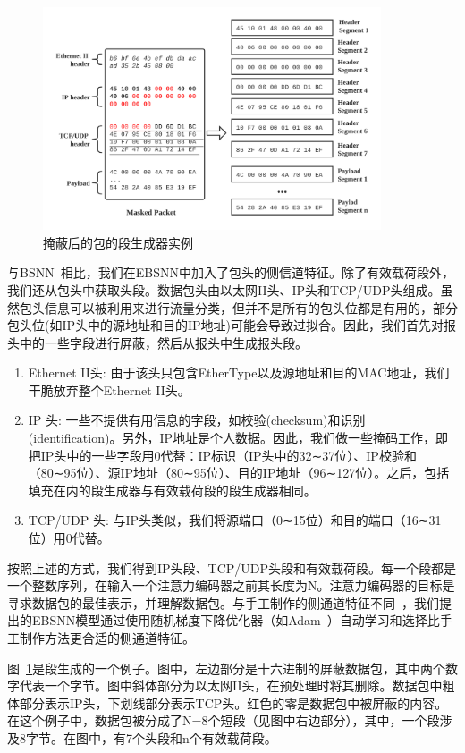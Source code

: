 \documentclass[degree=master,cjk-font=noto]{thuthesis}
\begin{document}
\begin{figure}[!tp]
	\centerline{\includegraphics[width=10cm]{BSNN_Segment.png}}
	\caption{掩蔽后的包的段生成器实例}
	\label{fig2}
\end{figure}

与BSNN~\cite{bsnn}相比，我们在EBSNN中加入了包头的侧信道特征。除了有效载荷段外，我们还从包头中获取头段。数据包头由以太网II头、IP头和TCP/UDP头组成。虽然包头信息可以被利用来进行流量分类，但并不是所有的包头位都是有用的，部分包头位(如IP头中的源地址和目的IP地址)可能会导致过拟合。因此，我们首先对报头中的一些字段进行屏蔽，然后从报头中生成报头段。

\begin{enumerate}
	\item Ethernet II头: 由于该头只包含EtherType以及源地址和目的MAC地址，我们干脆放弃整个Ethernet II头。
	\item IP 头: 一些不提供有用信息的字段，如校验(checksum)和识别(identification)。另外，IP地址是个人数据。因此，我们做一些掩码工作，即把IP头中的一些字段用0代替：IP标识（IP头中的32∼37位）、IP校验和（80∼95位）、源IP地址（80∼95位）、目的IP地址（96∼127位）。之后，包括填充在内的段生成器与有效载荷段的段生成器相同。
	\item TCP/UDP 头: 与IP头类似，我们将源端口（0∼15位）和目的端口（16∼31位）用0代替。
\end{enumerate}

按照上述的方式，我们得到IP头段、TCP/UDP头段和有效载荷段。每一个段都是一个整数序列，在输入一个注意力编码器之前其长度为N。注意力编码器的目标是寻求数据包的最佳表示，并理解数据包。与手工制作的侧通道特征不同~\cite{moore2005discriminators}，我们提出的EBSNN模型通过使用随机梯度下降优化器（如Adam~\cite{Adam}）自动学习和选择比手工制作方法更合适的侧通道特征。

图~\ref{fig2}是段生成的一个例子。图中，左边部分是十六进制的屏蔽数据包，其中两个数字代表一个字节。图中斜体部分为以太网II头，在预处理时将其删除。数据包中粗体部分表示IP头，下划线部分表示TCP头。红色的零是数据包中被屏蔽的内容。在这个例子中，数据包被分成了N=8个短段（见图中右边部分），其中，一个段涉及8字节。在图中，有7个头段和n个有效载荷段。
\end{document}
